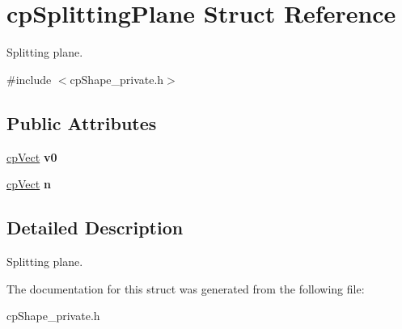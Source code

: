 \hypertarget{structcp_splitting_plane}{}\section{cp\+Splitting\+Plane Struct Reference}
\label{structcp_splitting_plane}


Splitting plane.  




{\ttfamily \#include $<$cp\+Shape\+\_\+private.\+h$>$}

\subsection*{Public Attributes}
\begin{DoxyCompactItemize}
\item 
\hypertarget{structcp_splitting_plane_a7bf5acca120e334f8b492f97dfc018e6}{}\hyperlink{structcp_vect}{cp\+Vect} {\bfseries v0}\label{structcp_splitting_plane_a7bf5acca120e334f8b492f97dfc018e6}

\item 
\hypertarget{structcp_splitting_plane_a06037e7cd8fb72c093d468b699c9f666}{}\hyperlink{structcp_vect}{cp\+Vect} {\bfseries n}\label{structcp_splitting_plane_a06037e7cd8fb72c093d468b699c9f666}

\end{DoxyCompactItemize}


\subsection{Detailed Description}
Splitting plane. 

The documentation for this struct was generated from the following file\+:\begin{DoxyCompactItemize}
\item 
cp\+Shape\+\_\+private.\+h\end{DoxyCompactItemize}
